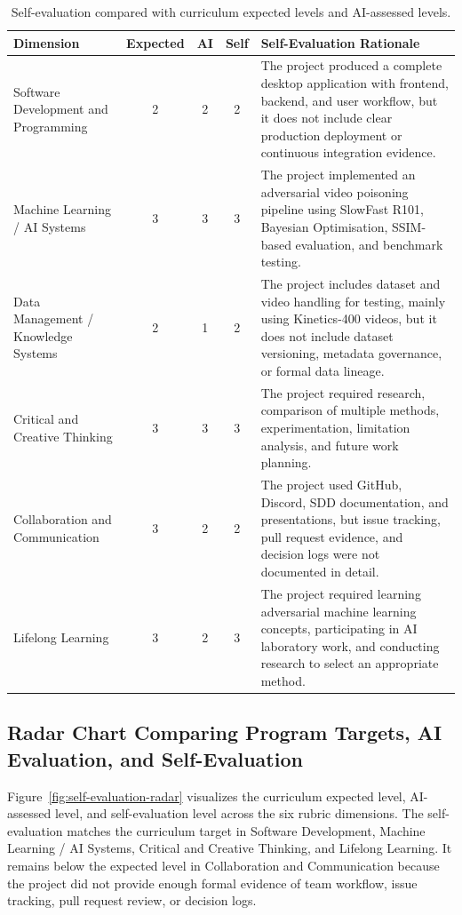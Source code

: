 \begin{table}[H]
\centering
\caption{Self-evaluation compared with curriculum expected levels and AI-assessed levels.}
\label{tab:self-evaluation-summary}
\renewcommand{\arraystretch}{1.3}
\begin{tabularx}{\textwidth}{|X|c|c|c|X|}
\hline
\textbf{Dimension} & \textbf{Expected} & \textbf{AI} & \textbf{Self} & \textbf{Self-Evaluation Rationale} \\
\hline
Software Development and Programming & 2 & 2 & 2 &
The project produced a complete desktop application with frontend,
backend, and user workflow, but it does not include clear production
deployment or continuous integration evidence. \\
\hline
Machine Learning / AI Systems & 3 & 3 & 3 &
The project implemented an adversarial video poisoning pipeline using
SlowFast R101, Bayesian Optimisation, SSIM-based evaluation, and
benchmark testing. \\
\hline
Data Management / Knowledge Systems & 2 & 1 & 2 &
The project includes dataset and video handling for testing, mainly
using Kinetics-400 videos, but it does not include dataset versioning,
metadata governance, or formal data lineage. \\
\hline
Critical and Creative Thinking & 3 & 3 & 3 &
The project required research, comparison of multiple methods,
experimentation, limitation analysis, and future work planning. \\
\hline
Collaboration and Communication & 3 & 2 & 2 &
The project used GitHub, Discord, SDD documentation, and presentations,
but issue tracking, pull request evidence, and decision logs were not
documented in detail. \\
\hline
Lifelong Learning & 3 & 2 & 3 &
The project required learning adversarial machine learning concepts,
participating in AI laboratory work, and conducting research to select
an appropriate method. \\
\hline
\end{tabularx}
\end{table}

\subsection{Radar Chart Comparing Program Targets, AI Evaluation, and Self-Evaluation}
\label{subsection:self-evaluation-radar}

Figure~\ref{fig:self-evaluation-radar} visualizes the curriculum
expected level, AI-assessed level, and self-evaluation level across
the six rubric dimensions. The self-evaluation matches the curriculum
target in Software Development, Machine Learning / AI Systems,
Critical and Creative Thinking, and Lifelong Learning. It remains
below the expected level in Collaboration and Communication because
the project did not provide enough formal evidence of team workflow,
issue tracking, pull request review, or decision logs.

